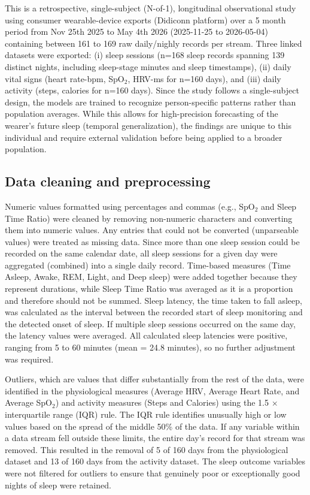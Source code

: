\documentclass[fleqn,10pt]{wlscirep}
\begin{document}
This is a retrospective, single-subject (N-of-1), longitudinal observational study using consumer wearable-device exports (Didiconn platform) over a 5 month period from Nov 25th 2025 to May 4th 2026 (2025-11-25 to 2026-05-04) containing between 161 to 169 raw daily/nighly records per stream. Three linked datasets were exported: (i) sleep sessions (n=168 sleep records spanning 139 distinct nights, including sleep-stage minutes and sleep timestamps), (ii) daily vital signs (heart rate-bpm, SpO$_2$, HRV-ms for n=160 days), and (iii) daily activity (steps, calories for n=160 days). Since the study follows a single-subject design, the models are trained to recognize person-specific patterns rather than population averages. While this allows for high-precision forecasting of the wearer's future sleep (temporal generalization), the findings are unique to this individual and require external validation before being applied to a broader population.

\subsection*{Data cleaning and preprocessing}

Numeric values formatted using percentages and commas (e.g., SpO$_2$ and Sleep Time Ratio) were cleaned by removing non-numeric characters and converting them into numeric values. Any entries that could not be converted (unparseable values) were treated as missing data. Since more than one sleep session could be recorded on the same calendar date, all sleep sessions for a given day were aggregated (combined) into a single daily record. Time-based measures (Time Asleep, Awake, REM, Light, and Deep sleep) were added together because they represent durations, while Sleep Time Ratio was averaged as it is a proportion and therefore should not be summed. Sleep latency, the time taken to fall asleep, was calculated as the interval between the recorded start of sleep monitoring and the detected onset of sleep. If multiple sleep sessions occurred on the same day, the latency values were averaged. All calculated sleep latencies were positive, ranging from 5 to 60 minutes (mean = 24.8 minutes), so no further adjustment was required.

Outliers, which are values that differ substantially from the rest of the data, were identified in the physiological measures (Average HRV, Average Heart Rate, and Average SpO$_2$) and activity measures (Steps and Calories) using the 1.5 $\times$ interquartile range (IQR) rule. The IQR rule identifies unusually high or low values based on the spread of the middle 50\% of the data. If any variable within a data stream fell outside these limits, the entire day's record for that stream was removed. This resulted in the removal of 5 of 160 days from the physiological dataset and 13 of 160 days from the activity dataset. The sleep outcome variables were not filtered for outliers to ensure that genuinely poor or exceptionally good nights of sleep were retained.
\end{document}
